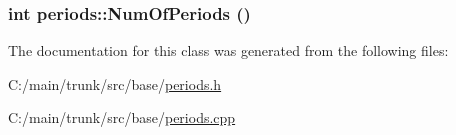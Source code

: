 \label{classperiods_ae425558a335cbc501737abe59f2869b2}
\hypertarget{classperiods_a2b04396ded0beb2aa694d70de7900ca7}{
\subsubsection[{NumOfPeriods}]{\setlength{\rightskip}{0pt plus 5cm}int periods::NumOfPeriods ()}}
\label{classperiods_a2b04396ded0beb2aa694d70de7900ca7}


The documentation for this class was generated from the following files:\begin{DoxyCompactItemize}
\item 
C:/main/trunk/src/base/\hyperlink{periods_8h}{periods.h}\item 
C:/main/trunk/src/base/\hyperlink{periods_8cpp}{periods.cpp}\end{DoxyCompactItemize}
